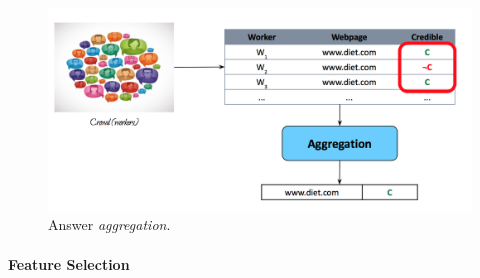 \begin{figure}[H]%
 \centering
 \includegraphics[width=13cm]{./img/08/aggregation}
 \caption{\label{pic:aggregation} Answer \emph{aggregation}.}
\end{figure}


\paragraph{Feature Selection}


